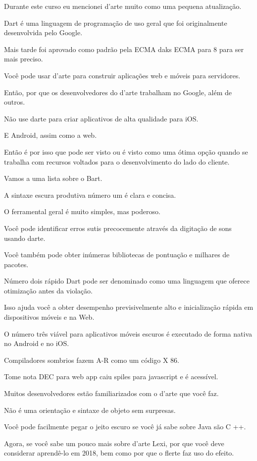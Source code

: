 Durante este curso eu mencionei d'arte muito como uma pequena atualização.

Dart é uma linguagem de programação de uso geral que foi originalmente desenvolvida pelo Google.

Mais tarde foi aprovado como padrão pela ECMA daks ECMA para 8 para ser mais preciso.

Você pode usar d'arte para construir aplicações web e móveis para servidores.

Então, por que os desenvolvedores do d'arte trabalham no Google, além de outros.

Não use darte para criar aplicativos de alta qualidade para iOS.

E Android, assim como a web.

Então é por isso que pode ser visto ou é visto como uma ótima opção quando se trabalha com recursos voltados para o desenvolvimento do lado do cliente.

Vamos a uma lista sobre o Bart.

A sintaxe escura produtiva número um é clara e concisa.

O ferramental geral é muito simples, mas poderoso.

Você pode identificar erros sutis precocemente através da digitação de sons usando darte.

Você também pode obter inúmeras bibliotecas de pontuação e milhares de pacotes.

Número dois rápido Dart pode ser denominado como uma linguagem que oferece otimização antes da violação.

Isso ajuda você a obter desempenho previsivelmente alto e inicialização rápida em dispositivos móveis e na Web.

O número três viável para aplicativos móveis escuros é executado de forma nativa no Android e no iOS.

Compiladores sombrios fazem A-R como um código X 86.

Tome nota DEC para web app caiu spiles para javascript e é acessível.

Muitos desenvolvedores estão familiarizados com o d'arte que você faz.

Não é uma orientação e sintaxe de objeto sem surpresas.

Você pode facilmente pegar o jeito escuro se você já sabe sobre Java são C ++.

Agora, se você sabe um pouco mais sobre d'arte Lexi, por que você deve considerar aprendê-lo em 2018, bem como por que o flerte faz uso do efeito.

